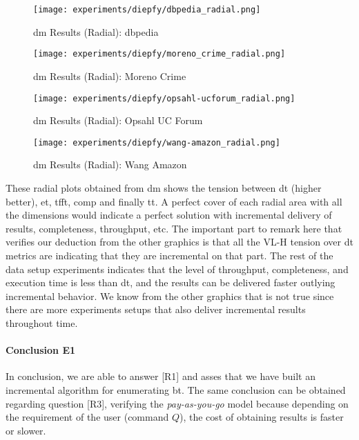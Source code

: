 \begin{figure}[!htb]
  \centering
  \begin{minipage}{0.5\textwidth}
   \texttt{[image: experiments/diepfy/dbpedia\_radial.png]}
    \caption{\acrshort{dm} Results (Radial): \acrshort{dbpedia}}
    \label{fig:dief:dbpedia-radial}
  \end{minipage}%
  \begin{minipage}{0.5\textwidth}
   \texttt{[image: experiments/diepfy/moreno\_crime\_radial.png]}
    \caption{\acrshort{dm} Results (Radial): Moreno Crime}
    \label{fig:dief:moreno-radial}
  \end{minipage}
\end{figure}
%
\begin{figure}[!htb]
  \centering
  \begin{minipage}{0.5\textwidth}
   \texttt{[image: experiments/diepfy/opsahl-ucforum\_radial.png]}
    \caption{\acrshort{dm} Results (Radial): Opsahl UC Forum}
    \label{fig:dief:opsahl-radial}
  \end{minipage}%
  \begin{minipage}{0.5\textwidth}
    \texttt{[image: experiments/diepfy/wang-amazon\_radial.png]}
     \caption{\acrshort{dm} Results (Radial): Wang Amazon}
     \label{fig:dief:wang-radial}
   \end{minipage}
 \end{figure}

These radial plots obtained from \acrshort{dm} shows the tension between \acrfull{dt} (higher better),
\acrfull{et}, \acrfull{tfft}, \acrfull{comp} and finally \acrfull{tt}. A perfect cover of each radial area with all the dimensions would
indicate a perfect solution with incremental delivery of results, completeness, throughput, etc. The important part to remark here that verifies
our deduction from the other graphics is that all the VL-H tension over \acrshort{dt} metrics are indicating that they are incremental on that part. 
The rest of the data setup experiments indicates that the level of throughput, completeness, and execution time is less than \acrfull{dt}, and the results can be delivered faster outlying incremental behavior. 
We know from the other graphics that is not true since there are more experiments setups that also deliver incremental results throughout time.

\paragraph{Conclusion E1} In conclusion, we are able to answer [R1] and asses that we have built an incremental algorithm for enumerating \acrlong{bt}. 
The same conclusion can be obtained regarding question [R3], verifying the \emph{pay-as-you-go} model because depending on the requirement of the user (command $Q$), the cost of obtaining results is faster or slower.

